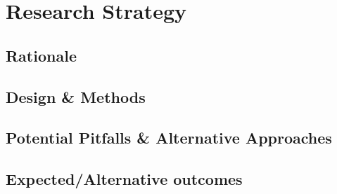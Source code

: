 \documentclass[11pt]{article}
\begin{document}
\section*{Research Strategy}

\subsection*{Rationale}

\subsection*{Design \& Methods}

\subsection*{Potential Pitfalls \& Alternative Approaches}

\subsection*{Expected/Alternative outcomes}

 

\end{document}
